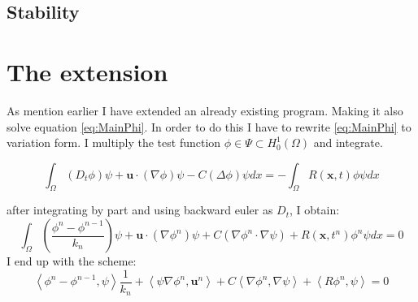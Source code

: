 \documentclass[12pt,a4paper,english]{article}
\begin{document}
\subsection*{Stability}

\section*{The extension}
As mention earlier I have extended an already existing program. Making it also solve equation \ref{eq:MainPhi}. In order to do this I have to rewrite \ref{eq:MainPhi} to variation form. I multiply the test function $\phi \in \Psi \subset H^{1}_{0}\left( \Omega \right)$ and integrate.


$$
\int_{\Omega} \left( D_t \phi \right)\psi + \textbf{u}\cdot\left( \nabla \phi \right)\psi - C\left( \Delta\phi\right) \psi dx = - \int_{\Omega} R(\textbf{x}, t) \phi\psi dx
$$


after integrating by part and using backward euler as $D_t$, I obtain:
$$
\int_{\Omega} \left( \frac{\phi^n - \phi^{n-1}}{k_n}\right) \psi + \textbf{u}\cdot\left( \nabla \phi^n \right)\psi + C\left( \nabla\phi^n \cdot \nabla \psi \right) + R\left( \textbf{x}, t^n \right) \phi^n \psi dx = 0
$$
I end up with the scheme:
\begin{equation}
\left\langle \phi^n -\phi^{n-1}, \psi \right\rangle \frac{1}{k_n} + \left\langle \psi \nabla \phi^n, \textbf{u}^n\right\rangle + C\left\langle \nabla \phi^n, \nabla \psi \right\rangle + \left\langle R\phi^n , \psi \right\rangle = 0
\label{eq:discretephi}
\end{equation}


%
%




%


\end{document}
